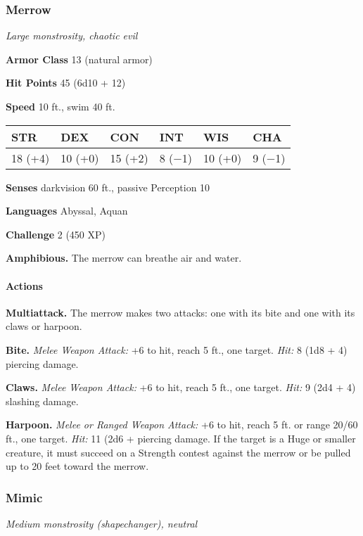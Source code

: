 \documentclass[
]{article}
\begin{document}
\hypertarget{merrow}{%
\subsubsection{Merrow}\label{merrow}}

\emph{Large monstrosity, chaotic evil}

\textbf{Armor Class} 13 (natural armor)

\textbf{Hit Points} 45 (6d10 + 12)

\textbf{Speed} 10 ft., swim 40 ft.

\begin{longtable}[]{@{}llllll@{}}
\toprule
STR & DEX & CON & INT & WIS & CHA\tabularnewline
\midrule
\endhead
18 (+4) & 10 (+0) & 15 (+2) & 8 (−1) & 10 (+0) & 9 (−1)\tabularnewline
\bottomrule
\end{longtable}

\textbf{Senses} darkvision 60 ft., passive Perception 10

\textbf{Languages} Abyssal, Aquan

\textbf{Challenge} 2 (450 XP)

\textbf{Amphibious.} The merrow can breathe air and water.

\hypertarget{actions-8}{%
\paragraph{Actions}\label{actions-8}}

\textbf{Multiattack.} The merrow makes two attacks: one with its bite
and one with its claws or harpoon.

\textbf{Bite.} \emph{Melee Weapon Attack:} +6 to hit, reach 5 ft., one
target. \emph{Hit:} 8 (1d8 + 4) piercing damage.

\textbf{Claws.} \emph{Melee Weapon Attack:} +6 to hit, reach 5 ft., one
target. \emph{Hit:} 9 (2d4 + 4) slashing damage.

\textbf{Harpoon.} \emph{Melee or Ranged Weapon Attack:} +6 to hit, reach
5 ft. or range 20/60 ft., one target. \emph{Hit:} 11 (2d6 + piercing
damage. If the target is a Huge or smaller creature, it must succeed on
a Strength contest against the merrow or be pulled up to 20 feet toward
the merrow.

\hypertarget{mimic}{%
\subsubsection{Mimic}\label{mimic}}

\emph{Medium monstrosity (shapechanger), neutral}
\end{document}
